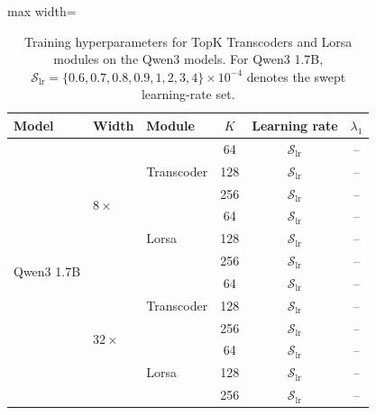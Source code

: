 \documentclass{article}
\begin{document}
\begin{table}[t]
    \centering
    \caption{
    Training hyperparameters for TopK Transcoders and Lorsa modules
    on the Qwen3 models. For Qwen3 1.7B,
    $\mathcal{S}_{\mathrm{lr}}=\{0.6,0.7,0.8,0.9,1,2,3,4\}\times10^{-4}$
    denotes the swept learning-rate set.
    }
    \label{tab:topk_training_hyperparameters_qwen}

    \captionsetup{skip=10pt}

    \footnotesize
    \renewcommand{\arraystretch}{1.0}
    \setlength{\tabcolsep}{8pt}

    \begin{adjustbox}{max width=\textwidth}
    \begin{tabular}{lllccc}
        \toprule
        Model
        & Width
        & Module
        & $K$
        & Learning rate
        & $\lambda_{1}$ \\
        \midrule

        \multirow{12}{*}{Qwen3 1.7B}
        & \multirow{6}{*}{$8\times$}
        & \multirow{3}{*}{Transcoder}
        & 64  & $\mathcal{S}_{\mathrm{lr}}$ & -- \\
        & & & 128 & $\mathcal{S}_{\mathrm{lr}}$ & -- \\
        & & & 256 & $\mathcal{S}_{\mathrm{lr}}$ & -- \\
        \cmidrule(lr){3-6}
        & & \multirow{3}{*}{Lorsa}
        & 64  & $\mathcal{S}_{\mathrm{lr}}$ & -- \\
        & & & 128 & $\mathcal{S}_{\mathrm{lr}}$ & -- \\
        & & & 256 & $\mathcal{S}_{\mathrm{lr}}$ & -- \\
        \cmidrule(lr){2-6}
        & \multirow{6}{*}{$32\times$}
        & \multirow{3}{*}{Transcoder}
        & 64  & $\mathcal{S}_{\mathrm{lr}}$ & -- \\
        & & & 128 & $\mathcal{S}_{\mathrm{lr}}$ & -- \\
        & & & 256 & $\mathcal{S}_{\mathrm{lr}}$ & -- \\
        \cmidrule(lr){3-6}
        & & \multirow{3}{*}{Lorsa}
        & 64  & $\mathcal{S}_{\mathrm{lr}}$ & -- \\
        & & & 128 & $\mathcal{S}_{\mathrm{lr}}$ & -- \\
        & & & 256 & $\mathcal{S}_{\mathrm{lr}}$ & -- \\

        \midrule


\end{tabular}
\end{adjustbox}
\end{table}
\end{document}
